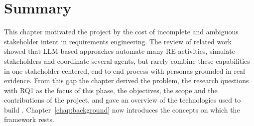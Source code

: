 \section{Summary}
\label{sec:intro-summary}
This chapter motivated the project by the cost of incomplete and ambiguous stakeholder intent in requirements engineering. The review of related work showed that LLM-based approaches automate many RE activities, simulate stakeholders and coordinate several agents, but rarely combine these capabilities in one stakeholder-centered, end-to-end process with personas grounded in real evidence. From this gap the chapter derived the problem, the research questions with RQ1 as the focus of this phase, the objectives, the scope and the contributions of the project, and gave an overview of the technologies used to build \sysname{}. Chapter~\ref{chap:background} now introduces the concepts on which the framework rests.
